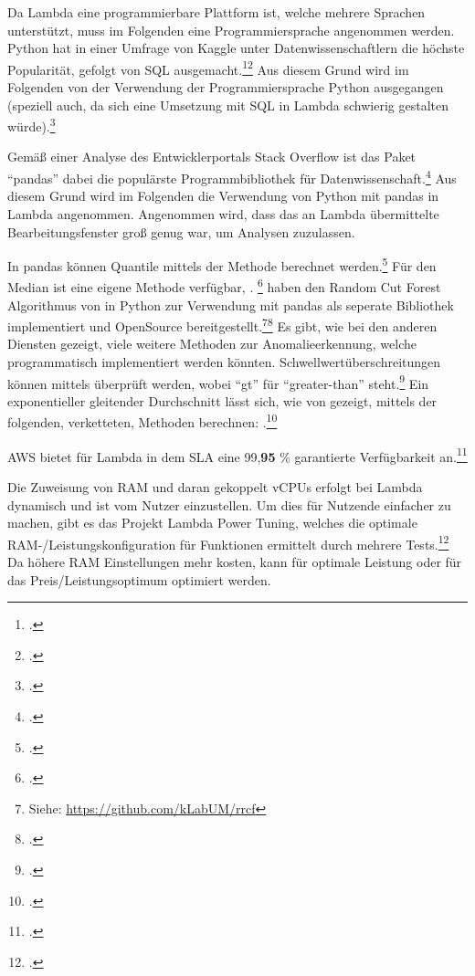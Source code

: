 Da Lambda eine programmierbare Plattform ist, welche mehrere Sprachen unterstützt, muss im Folgenden eine Programmiersprache angenommen werden. Python hat in einer Umfrage von Kaggle unter Datenwissenschaftlern die höchste Popularität, gefolgt von \ac{SQL} ausgemacht.\footcite[Vgl.][]{KaggleInc..2019}\nzitat\footcite[Vgl.][]{Hayes.2020} Aus diesem Grund wird im Folgenden von der Verwendung der Programmiersprache Python ausgegangen (speziell auch, da sich eine Umsetzung mit \ac{SQL} in Lambda schwierig gestalten würde).\footcite[Vgl.][]{Hayes.2020} 

Gemäß einer Analyse des Entwicklerportals Stack Overflow ist das Paket \enquote{pandas} dabei die populärste Programmbibliothek für Datenwissenschaft.\footcite[Vgl.][]{Robinson.2017} Aus diesem Grund wird im Folgenden die Verwendung von Python mit pandas in Lambda angenommen. Angenommen wird, dass das an Lambda übermittelte Bearbeitungsfenster groß genug war, um Analysen zuzulassen.

In pandas können Quantile mittels der  Methode berechnet werden.\footcite[Vgl.][]{o.V..o.J.c} Für den Median ist eine eigene Methode verfügbar, . \footcite[Vgl.][]{o.V..o.J.d}
\citeauthor{Bartos.2019} haben den Random Cut Forest Algorithmus von \citeauthor{Guha.2016} in Python zur Verwendung mit pandas als seperate Bibliothek implementiert und OpenSource bereitgestellt.\footnote{Siehe: \url{https://github.com/kLabUM/rrcf}}\nzitat\footcite[Vgl.][]{Bartos.2019} Es gibt, wie bei den anderen Diensten gezeigt, viele weitere Methoden zur Anomalieerkennung, welche programmatisch implementiert werden könnten.
Schwellwertüberschreitungen können mittels  überprüft werden, wobei \enquote{gt} für \enquote{greater-than} steht.\footcite[Vgl.][]{o.V..o.J.e}
Ein exponentieller gleitender Durchschnitt lässt sich, wie von \citeauthor{Sharma.2019} gezeigt, mittels der folgenden, verketteten, Methoden berechnen: .\footcite[Vgl.][]{Sharma.2019} 

\ac{AWS} bietet für Lambda in dem \ac{SLA} eine 99,\textbf{95} \% garantierte Verfügbarkeit an.\footcite[Vgl.][]{AmazonWebServicesInc..2019d}

Die Zuweisung von \ac{RAM} und daran gekoppelt vCPUs erfolgt bei Lambda dynamisch und ist vom Nutzer einzustellen. Um dies für Nutzende einfacher zu machen, gibt es das Projekt Lambda Power Tuning, welches die optimale \ac{RAM}-/Leistungskonfiguration für Funktionen ermittelt durch mehrere Tests.\footcite[Vgl. auch im Folgenden][]{AmazonWebServicesInc..o.J.at} Da höhere \ac{RAM} Einstellungen mehr kosten, kann für optimale Leistung oder für das Preis/Leistungsoptimum optimiert werden.

